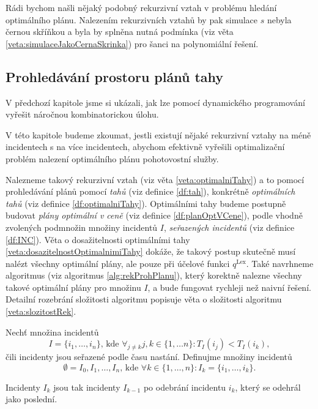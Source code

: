 Rádi bychom našli nějaký podobný rekurzivní vztah v problému hledání optimálního plánu.
Nalezením rekurzivních vztahů by pak simulace $s$ nebyla černou skříňkou a byla by splněna nutná podmínka (viz věta \ref{veta:simulaceJakoCernaSkrinka}) pro šanci na polynomiální řešení.

\subsection{Prohledávání prostoru plánů tahy}

V předchozí kapitole jsme si ukázali, jak lze pomocí dynamického programování
vyřešit náročnou kombinatorickou úlohu.

V této kapitole budeme zkoumat, jestli existují nějaké rekurzivní vztahy 
 na méně incidentech s  na více incidentech, abychom efektivně vyřešili optimalizační problém nalezení optimálního plánu pohotovostní služby. 

Nalezneme takový rekurzivní vztah (viz věta \ref{veta:optimalniTahy}) a to pomocí prohledávání plánů pomocí \textit{tahů} (viz definice \ref{df:tah}),
konkrétně \textit{optimálních tahů} (viz definice \ref{df:optimalniTahy}).
Optimálními tahy budeme postupně budovat \textit{plány optimální v ceně} (viz definice \ref{df:planOptVCene}),
podle vhodně zvolených podmnožin množiny incidentů $I$, \textit{seřazených incidentů} (viz definice \ref{df:INC}).
Věta o dosažitelnosti optimálními tahy \ref{veta:dosazitelnostOptimalnimiTahy} dokáže, že takový postup skutečně musí nalézt všechny optimální plány, ale pouze při účelové funkci $q^{\text{Lex}}$.
Také navrhneme algoritmus (viz algoritmus \ref{alg:rekProhPlanu}),
který korektně nalezne všechny takové optimální plány pro množinu $I$, a bude fungovat rychleji než naivní řešení.
Detailní rozebrání složitosti algoritmu popisuje věta o složitosti algoritmu \ref{veta:slozitostRek}.

\begin{definice}\label{df:INC}
  Nechť množina incidentů 
  \begin{equation*}
    I = \{ i_1, \dots , i_n \} \text{, kde } \forall_{j \not = k} j, k \in \{ 1, \dots n\} \colon T_I(i_j) < T_I(i_k),
  \end{equation*}
  čili incidenty jsou seřazené podle času nastání.
  Definujme množiny incidentů
  \begin{equation*}
    \emptyset = I_0, I_1, \dots, I_n \text{, kde } \forall k \in \{ 1, \dots, n \} \colon I_k = \{ i_1, \dots, i_k \}.
  \end{equation*}

  Incidenty $I_k$ jsou tak incidenty $I_{k-1}$ po odebrání incidentu $i_k$, který se odehrál jako poslední.
\end{definice}

